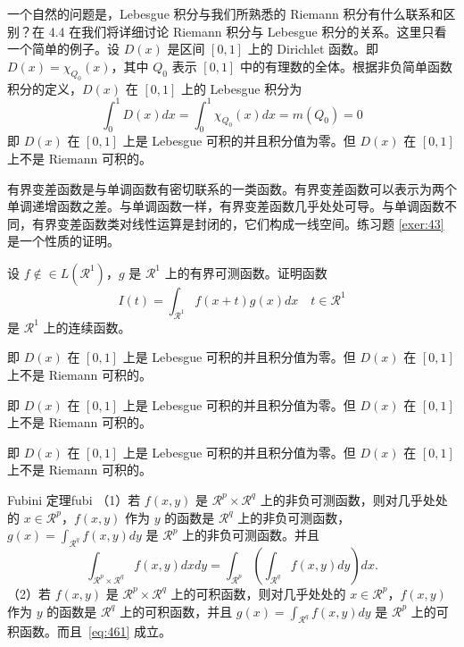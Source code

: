	
	
	一个自然的问题是，Lebesgue 积分与我们所熟悉的 Riemann 积分有什么联系和区别？在 4.4 在我们将详细讨论 Riemann 积分与 Lebesgue 积分的关系。这里只看一个简单的例子。设 $D(x)$ 是区间 $[0,1]$ 上的 Dirichlet 函数。即 $D(x)=\chi_{Q_0}(x)$，其中 $Q_0$ 表示 $[0,1]$ 中的有理数的全体。根据非负简单函数积分的定义，$D(x)$ 在 $[0,1]$ 上的 Lebesgue 积分为
	\begin{equation}
 \label{inter2}
 \int_0^1 D(x)dx = \int_0^1 \chi_{Q_0} (x) dx = m(Q_0) = 0
	\end{equation}
	即 $D(x)$ 在 $[0,1]$ 上是 Lebesgue 可积的并且积分值为零。但 $D(x)$ 在 $[0,1]$ 上不是 Riemann 可积的。
	
	
	
	有界变差函数是与单调函数有密切联系的一类函数。有界变差函数可以表示为两个单调递增函数之差。与单调函数一样，有界变差函数几乎处处可导。与单调函数不同，有界变差函数类对线性运算是封闭的，它们构成一线空间。练习题 \ref{exer:43} 是一个性质的证明。
	
	\begin{exercise}\label{exer:43}
	设 $f \notin\in L(\mathcal{R}^1)$，$g$ 是 $\mathcal{R}^1$ 上的有界可测函数。证明函数
	\begin{equation}
 \label{ex:1}
 I(t) = \int_{\mathcal{R}^1} f(x+t)g(x)dx \quad t \in \mathcal{R}^1
	\end{equation}
	是 $\mathcal{R}^1$ 上的连续函数。
	\end{exercise}
	
	\begin{problem}
	即 $D(x)$ 在 $[0,1]$ 上是 Lebesgue 可积的并且积分值为零。但 $D(x)$ 在 $[0,1]$ 上不是 Riemann 可积的。
	\end{problem}
	
	\begin{example}
	即 $D(x)$ 在 $[0,1]$ 上是 Lebesgue 可积的并且积分值为零。但 $D(x)$ 在 $[0,1]$ 上不是 Riemann 可积的。
	\end{example}
	
	\begin{solution}
	即 $D(x)$ 在 $[0,1]$ 上是 Lebesgue 可积的并且积分值为零。但 $D(x)$ 在 $[0,1]$ 上不是 Riemann 可积的。
	\end{solution}
	
	\begin{theorem}{Fubini 定理}{fubi} 
	（1）若 $f(x,y)$ 是 $\mathcal{R}^p\times\mathcal{R}^q$ 上的非负可测函数，则对几乎处处的 $x\in \mathcal{R}^p$，$f(x,y)$ 作为 $y$ 的函数是 $\mathcal{R}^q$ 上的非负可测函数，$g(x)=\int_{\mathcal{R}^q}f(x,y) dy$ 是 $\mathcal{R}^p$ 上的非负可测函数。并且
	\begin{equation}
 \label{eq:461}
 \int_{\mathcal{R}^p\times\mathcal{R}^q} f(x,y) dxdy=\int_{\mathcal{R}^p}\left(\int_{\mathcal{R}^q}f(x,y)dy\right)dx.
	\end{equation}
	（2）若 $f(x,y)$ 是 $\mathcal{R}^p\times\mathcal{R}^q$ 上的可积函数，则对几乎处处的 $x\in\mathcal{R}^p$，$f(x,y)$ 作为 $y$ 的函数是 $\mathcal{R}^q$ 上的可积函数，并且 $g(x)=\int_{\mathcal{R}^q}f(x,y) dy$ 是 $\mathcal{R}^p$ 上的可积函数。而且~\ref{eq:461} 成立。
	\end{theorem}
	
